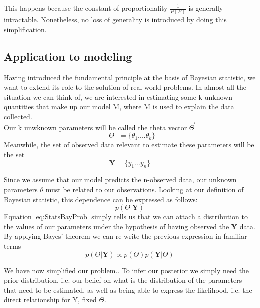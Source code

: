 \documentclass[letterpaper]{article}
\begin{document}
	This happens because the constant of proportionality $\frac{1}{P(E)}$ is generally intractable. Nonetheless, no loss of generality is introduced by doing this simplification.
	
	\subsection{Application to modeling}
	
	Having introduced the fundamental principle at the basis of Bayesian statistic, we want to extend its role to the solution of real world problems. 
	In almost all the situation we can think of, we are interested in estimating some k unknown quantities that make up our model M, where M is used to explain the data collected.\\
	Our k unwknown parameters will be called the theta vector
	$\vec{\Theta}$
	\begin{equation*}
	\textbf{ $\Theta$ } = \{ \theta_1 .... \theta_k \}
	\end{equation*}
	Meanwhile, the set of observed data relevant to estimate these parameters will be the set
	\begin{equation*}
	\textbf{Y}=\{y_1...y_n\}
	\end{equation*}
	
	Since we assume that our model predicts the n-observed data, our unknown parameters \textbf{$\theta$} must be related to our observations. Looking at our definition of Bayesian statistic, this dependence can be expressed as follows:
	\begin{equation}
	p(\textbf{$\Theta$}|\textbf{Y})
	\label{eq:StatsBayProb}
	\end{equation}
	Equation \ref{eq:StatsBayProb} simply tells us that we can attach a distribution to the values of our parameters under the hypothesis of having observed the \textbf{Y} data. By applying Bayes' theorem we can re-write the previous expression in familiar terms
	\begin{equation}
	p(\textbf{$\Theta$}|\textbf{Y}) \propto p(\textbf{$\Theta$})p(\textbf{Y}|\textbf{$\Theta$})
	\label{eq:BaePost}
	\end{equation}
	
	We have now simplified our problem.. To infer our posterior we simply need the prior distribution, i.e. our belief on what is the distribution of the parameters that need to be estimated, as well as being able to express the likelihood, i.e. the direct relationship for Y, fixed $\Theta$.
	
\end{document}
